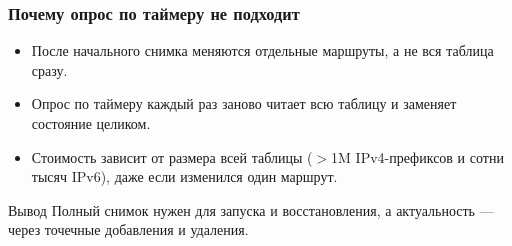 \begin{frame}\frametitle{Почему опрос по таймеру не подходит}
\begin{itemize}\setlength{\itemsep}{0.15em}
  \item После начального снимка меняются отдельные маршруты, а не вся
  таблица сразу.
  \item Опрос по таймеру каждый раз заново читает всю таблицу и заменяет
  состояние целиком.
  \item Стоимость зависит от размера всей таблицы
  ($>$1M IPv4-префиксов и сотни тысяч IPv6), даже если изменился один
  маршрут.
\end{itemize}

\vspace{0.1em}
\begin{block}{Вывод}
\centering
Полный снимок нужен для запуска и восстановления, а актуальность ---
через точечные добавления и удаления.
\end{block}
\end{frame}
